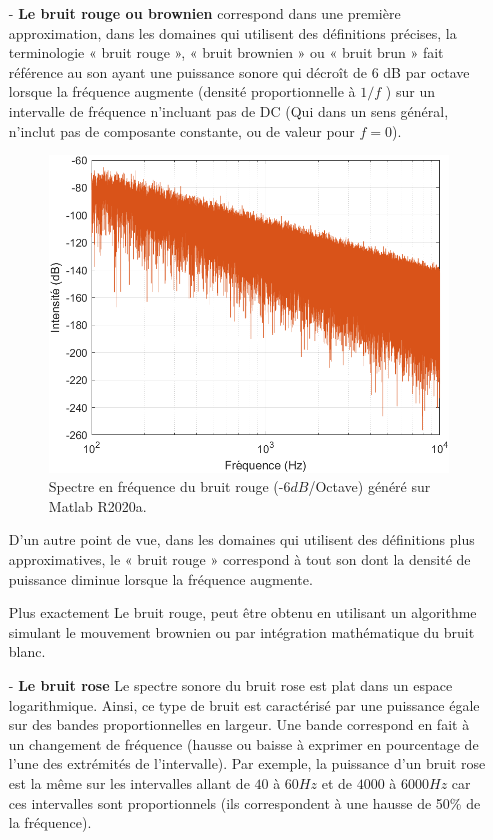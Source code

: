 \documentclass[conference,onecolumn]{IEEEtran}
\begin{document}
\begin{itemize} %

    \item[-] \textbf{Le bruit rouge ou brownien} correspond dans une première approximation, dans les domaines qui utilisent des définitions précises, la terminologie « bruit rouge », « bruit brownien » ou « bruit brun » fait référence au son ayant une puissance sonore qui décroît de 6 dB par octave lorsque la fréquence augmente (densité proportionnelle à $1/f$ ) sur un intervalle de fréquence n'incluant pas de DC (Qui dans un sens général, n'inclut pas de composante constante, ou de valeur pour $f=0$). 

    \begin{figure}[H]
        \centering
        \includegraphics[scale=0.5]{img7.png}
        \caption{Spectre en fréquence du bruit rouge (-$6dB$/Octave) généré sur Matlab R2020a.}
    \end{figure}

    D’un autre point de vue, dans les domaines qui utilisent des définitions plus approximatives, le « bruit rouge » correspond à tout son dont la densité de puissance diminue lorsque la fréquence augmente. 

    Plus exactement Le bruit rouge, peut être obtenu en utilisant un algorithme simulant le mouvement brownien ou par intégration mathématique du bruit blanc.
    
    \item[-] \textbf{Le bruit rose} Le spectre sonore du bruit rose est plat dans un espace logarithmique. Ainsi, ce type de bruit est caractérisé par une puissance égale sur des bandes proportionnelles en largeur. Une bande correspond en fait à un changement de fréquence (hausse ou baisse à exprimer en pourcentage de l’une des extrémités de l’intervalle). Par exemple, la puissance d’un bruit rose est la même sur les intervalles allant de $40$ à $60 Hz$ et de $4 000$ à $6 000 Hz$ car ces intervalles sont proportionnels (ils correspondent à une hausse de 50\% de la fréquence).


\end{itemize}
\end{document}
